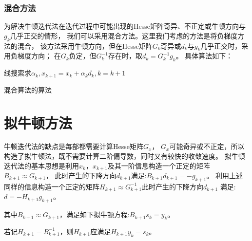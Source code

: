     \subsubsection{混合方法}
        为解决牛顿迭代法在迭代过程中可能出现的Hesse矩阵奇异、不正定或牛顿方向与$g_k$几乎正交的情形，
        我们可以采用混合方法。这里我们考虑的方法是将负梯度方法的混合，
        该方法采用牛顿方向，但在Hesse矩阵$G_k$奇异或$d_k$与$g_k$几乎正交时，采用负梯度方向；
        在$G_k$负定，但$G^{-1}_k$存在时，取$d_k=G^{-1}_kg_k$。
        具体算法如下：
        \begin{algorithm}
            \SetAlgoLined
             {
                线搜索求$\alpha_k,x_{k+1}=x_k+\alpha_kd_k,k=k+1$
            }
            \caption{混合算法的算法}
        \end{algorithm}
            
    \section{拟牛顿方法}
        牛顿迭代法的缺点是每部都需要计算Hesse矩阵$G_x$，
        $G_x$可能奇异或不正定，所以构造了拟牛顿法，既不需要计算二阶偏导数，同时又有较快的收敛速度。
        拟牛顿迭代法的基本思想是利用$x_k$，$x_{k+1}$及其一阶信息构造一个正定的矩阵$B_{k+1}\approx G_{k+1}$，
        此时产生的下降方向$d_{k+1}$满足:$B_{k+1}d_{k+1}=-g_{k+1}$。
        利用上述同样的信息构造一个正定的矩阵$H_{k+1}\approx G_{k+1}^{-1}$此时产生的下降方向$d_{k+1}$
        满足:$d=-H_{k+1}g_{k+1}$。
        
        其中$B_{k+1}\approx G_{k+1}$，满足如下拟牛顿方程:$B_{k+1}s_k=y_k$。
        
        若记$H_{k+1}=B_{k+1}^{-1}$，则$H_{k+1}$应满足$H_{k+1}y_k=s_k$。
        
